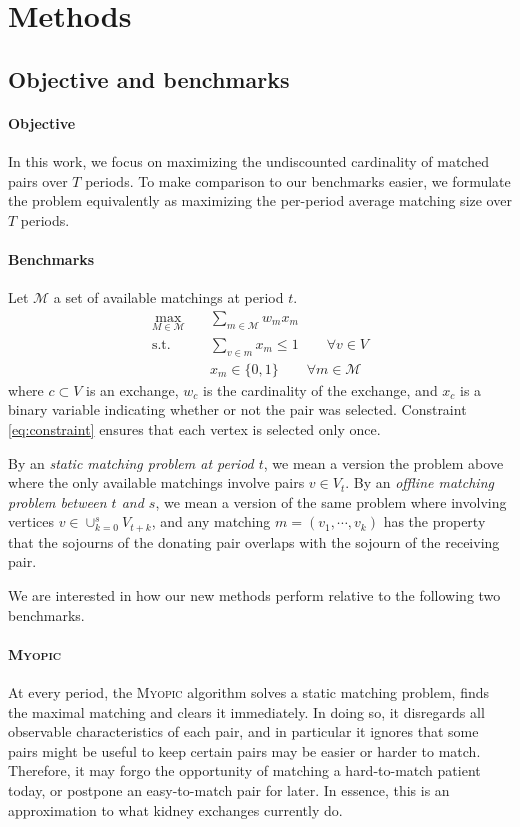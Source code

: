 \section{Methods}

\subsection{Objective and benchmarks}

\paragraph{Objective} In this work, we focus on maximizing the undiscounted cardinality of matched pairs over $T$ periods. To make comparison to our benchmarks easier, we formulate the problem equivalently as maximizing the per-period average matching size over $T$ periods. 


\paragraph{Benchmarks} Let $\mathcal{M}$ a set of available matchings at period $t$.
\begin{align}
  \max_{M \in \mathcal{M}}  &\sum_{m \in \mathcal{M}} w_{m} x_{m} \\
  \text{s.t.} \qquad &\sum_{v \in m} x_{m} \leq 1  \qquad   \forall v \in V\\ \label{eq:constraint}
        &x_{m} \in \{ 0, 1 \} \qquad   \forall m \in \mathcal{M}   
\end{align}
\noindent where $c \subset V$ is an exchange, $w_{c}$ is the cardinality of the exchange, and $x_c$ is a binary variable indicating whether or not the pair was selected. Constraint \ref{eq:constraint} ensures that each vertex is selected only once.

By an \emph{static matching problem at period $t$}, we mean a version the problem above where the only available matchings involve pairs $v \in V_{t}$. By an \emph{offline matching problem between $t$ and $s$}, we mean a version of the same problem where involving vertices $v \in \cup_{k=0}^{s} V_{t+k}$, and any matching $m = (v_{1}, \cdots, v_{k})$ has the property that the sojourns of the donating pair overlaps with the sojourn of the receiving pair.

We are interested in how our new methods perform relative to the following two benchmarks.

\paragraph{\textsc{Myopic}} At every period, the \textsc{Myopic} algorithm solves a static matching problem, finds the maximal matching and clears it immediately. In doing so, it disregards all observable characteristics of each pair, and in particular it ignores that some pairs might be useful to keep certain pairs may be easier or harder to match. Therefore, it may forgo the opportunity of matching a hard-to-match patient today, or postpone an easy-to-match pair for later. In essence, this is an approximation to what kidney exchanges currently do.

